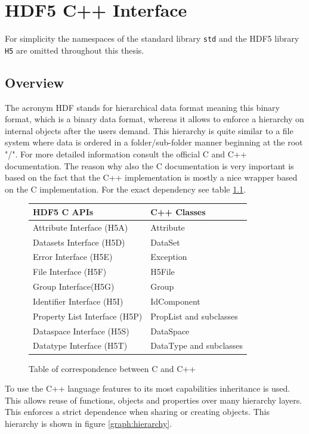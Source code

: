 \chapter{HDF5 C++ Interface}
For simplicity the namespaces of the standard library \texttt{std} and the HDF5 library \texttt{H5} are omitted throughout this thesis.
\section{Overview}
The acronym HDF stands for hierarchical data format meaning this binary format, which is a binary data format, whereas it allows to enforce a hierarchy on internal objects after the users demand. This hierarchy is quite similar to a file system where data is ordered in a folder/sub-folder manner beginning at the root "/". For more detailed information consult the official C \cite{hdf5cdoc} and C++ \cite{hdf5cppdoc} documentation. The reason why also the C documentation is very important is based on the fact that the C++ implementation is mostly a nice wrapper based on the C implementation. For the exact dependency see table \ref{table:corrs}. \\ %
\begin{figure}[ht!]
\centering
\begin{tabular}{|l|l|}
\hline
HDF5 C APIs&C++ Classes\\
\hline
Attribute Interface (H5A)&Attribute\\
Datasets Interface (H5D)&DataSet\\
Error Interface (H5E)&Exception\\
File Interface (H5F)&H5File\\
Group Interface(H5G)&Group\\
Identifier Interface (H5I)&IdComponent\\
Property List Interface (H5P)&PropList and subclasses\\
Dataspace Interface (H5S)&DataSpace\\
Datatype Interface (H5T)&DataType and subclasses\\
\hline
\end{tabular}
\caption{Table of correspondence between C and C++}
\label{table:corrs}
\end{figure}
To use the C++ language features to its most capabilities inheritance is used. This allows reuse of functions, objects and properties over many hierarchy layers. This enforces a strict dependence when sharing or creating objects. This hierarchy is shown in figure \ref{graph:hierarchy}.

